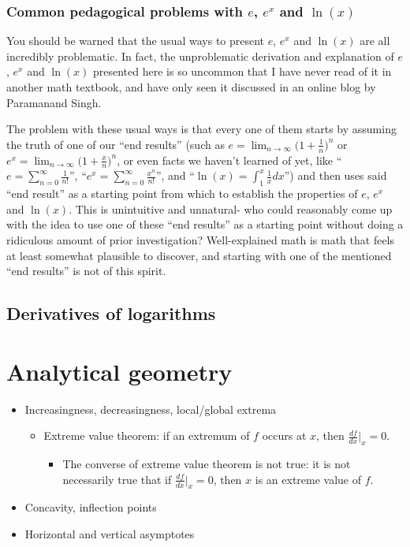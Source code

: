 \subsubsection*{Common pedagogical problems with $e$, $e^x$ and $\ln(x)$}

You should be warned that the usual ways to present $e$, $e^x$ and $\ln(x)$ are all incredibly problematic. In fact, the unproblematic derivation and explanation of $e$, $e^x$ and $\ln(x)$ presented here is so uncommon that I have never read of it in another math textbook, and have only seen it discussed in an online blog by Paramanand Singh.

The problem with these usual ways is that every one of them starts by assuming the truth of one of our ``end results'' (such as $e = \lim_{n \rightarrow \infty} \Big(1 + \frac{1}{n} \Big)^n$ or $e^x = \lim_{n \rightarrow \infty} \Big(1 + \frac{x}{n} \Big)^n$, or even facts we haven't learned of yet, like ``$e = \sum_{n = 0}^\infty \frac{1}{n!}$'', ``$e^x = \sum_{n = 0}^\infty \frac{x^n}{n!}$'', and ``$\ln(x) = \int_1^x \frac{1}{x} dx$'') and then uses said ``end result'' as a starting point from which to establish the properties of $e$, $e^x$ and $\ln(x)$. This is unintuitive and unnatural- who could reasonably come up with the idea to use one of these ``end results'' as a starting point without doing a ridiculous amount of prior investigation? Well-explained math is math that feels at least somewhat plausible to discover, and starting with one of the mentioned ``end results'' is not of this spirit.

\subsection*{Derivatives of logarithms}



\section*{Analytical geometry}

\begin{itemize}
    \item Increasingness, decreasingness, local/global extrema
    \begin{itemize}
        \item Extreme value theorem: if an extremum of $f$ occurs at $x$, then $\frac{df}{dx}\Big|_x = 0$.
        \begin{itemize}
            \item The converse of extreme value theorem is not true: it is not necessarily true that if $\frac{df}{dx}\Big|_x = 0$, then $x$ is an extreme value of $f$.
        \end{itemize}
    \end{itemize}
    \item Concavity, inflection points
    \item Horizontal and vertical asymptotes
\end{itemize}

